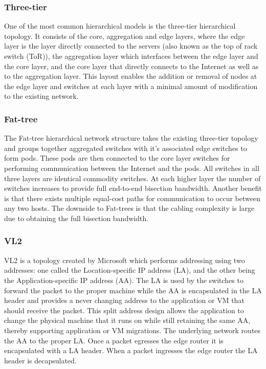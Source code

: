 \documentclass[12pt]{article}
\begin{document}
\subsubsection{Three-tier} \label{subp:three-tier}

One of the most common hierarchical models is the three-tier \cite{kliazovich2012greencloud} hierarchical topology. It consists of the core, aggregation and edge layers, where the edge layer is the layer directly connected to the servers (also known as the top of rack switch (ToR)), the aggregation layer which interfaces between the edge layer and the core layer, and the core layer that directly connects to the Internet as well as to the aggregation layer. This layout enables the addition or removal of nodes at the edge layer and switches at each layer with a minimal amount of modification to the existing network.

\subsubsection{Fat-tree} \label{subp:fat-tree}

The Fat-tree \cite{al2008scalable} hierarchical network structure takes the existing three-tier topology and groups together aggregated switches with it's associated edge switches to form pods. These pods are then connected to the core layer switches for performing communication between the Internet and the pods. All switches in all three layers are identical commodity switches. At each higher layer the number of switches increases to provide full end-to-end bisection bandwidth. Another benefit is that there exists multiple equal-cost paths for communication to occur between any two hosts. The downside to Fat-trees is that the cabling complexity is large due to obtaining the full bisection bandwidth.

\subsubsection{VL2} \label{subp:vl2}

VL2 \cite{greenberg2009vl2} is a topology created by Microsoft which performs addressing using two addresses: one called the Location-specific IP address (LA), and the other being the Application-specific IP address (AA). The LA is used by the switches to forward the packet to the proper machine while the AA is encapsulated in the LA header and provides a never changing address to the application or VM that should receive the packet. This split address design allows the application to change the physical machine that it runs on while still retaining the same AA, thereby supporting application or VM migrations. The underlying network routes the AA to the proper LA. Once a packet egresses the edge router it is encapsulated with a LA header. When a packet ingresses the edge router the LA header is decapsulated.
\end{document}
